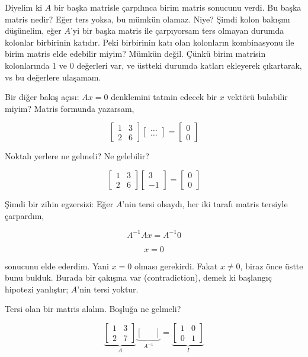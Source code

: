 \documentclass[12pt,fleqn]{article}\usepackage{../../common}
\begin{document}
Diyelim ki $A$ bir başka matrisle çarpılınca birim matris sonucunu
verdi. Bu başka matris nedir? Eğer ters yoksa, bu mümkün olamaz. Niye?
Şimdi kolon bakışını düşünelim, eğer $A$'yi bir başka matris ile
çarpıyorsam ters olmayan durumda kolonlar birbirinin katıdır. Peki
birbirinin katı olan kolonların kombinasyonu ile birim matris elde edebilir
miyim? Mümkün değil. Çünkü birim matrisin kolonlarında 1 ve 0 değerleri
var, ve üstteki durumda katları ekleyerek çıkartarak, vs bu değerlere
ulaşamam. 

Bir diğer bakış açısı: $Ax = 0$ denklemini tatmin edecek bir $x$ vektörü
bulabilir miyim? Matris formunda yazarsam, 

$$ 
\left[\begin{array}{rr}
1 & 3 \\ 2 & 6
\end{array}\right]
\left[\begin{array}{r}
\dots \\ \dots
\end{array}\right]
=
\left[\begin{array}{r}
0 \\ 0
\end{array}\right]
 $$

Noktalı yerlere ne gelmeli? Ne gelebilir? 

$$ 
\left[\begin{array}{rr}
1 & 3 \\ 2 & 6
\end{array}\right]
\left[\begin{array}{r}
3 \\ -1
\end{array}\right]
=
\left[\begin{array}{r}
0 \\ 0
\end{array}\right]
 $$
 
Şimdi bir zihin egzersizi: Eğer $A$'nin tersi olsaydı, her iki tarafı
matris tersiyle çarpardım,

$$A^{-1}Ax = A^{-1} 0$$

$$x = 0$$

sonucunu elde ederdim. Yani $x=0$ olması gerekirdi. Fakat $x \ne 0$, biraz
önce üstte bunu bulduk. Burada bir çakışma var (contradiction), demek ki
başlangıç hipotezi yanlıştır; $A$'nin tersi yoktur. 

Tersi olan bir matris alalım. Boşluğa ne gelmeli?

$$ 
\underbrace{
\left[\begin{array}{rrr}
1 & 3 \\
2 & 7
\end{array}\right]
}_{A}
\underbrace{
\left[\begin{array}{rrr}
 &  \\
 & 
\end{array}\right]
}_{A^{-1}}
=
\underbrace{
\left[\begin{array}{rrr}
1 & 0 \\
0 & 1
\end{array}\right]
}_{I}
 $$
\end{document}
